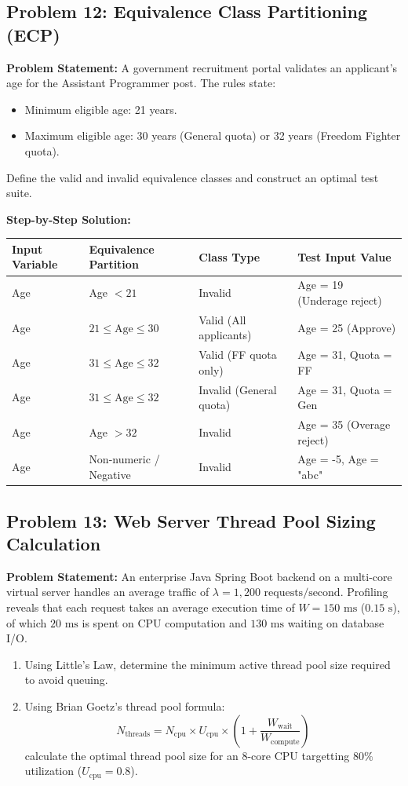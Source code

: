 \subsection*{Problem 12: Equivalence Class Partitioning (ECP)}
\textbf{Problem Statement:} A government recruitment portal validates an applicant's age for the Assistant Programmer post. The rules state:
\begin{itemize}
    \item Minimum eligible age: 21 years.
    \item Maximum eligible age: 30 years (General quota) or 32 years (Freedom Fighter quota).
\end{itemize}
Define the valid and invalid equivalence classes and construct an optimal test suite.

\textbf{Step-by-Step Solution:}
\begin{center}
\small
\begin{tabular}{p{3.5cm}p{5.5cm}p{3cm}p{3cm}}
\toprule
\textbf{Input Variable} & \textbf{Equivalence Partition} & \textbf{Class Type} & \textbf{Test Input Value} \\
\midrule
Age & Age $< 21$ & Invalid & Age = 19 (Underage reject) \\
Age & $21 \le \text{Age} \le 30$ & Valid (All applicants) & Age = 25 (Approve) \\
Age & $31 \le \text{Age} \le 32$ & Valid (FF quota only) & Age = 31, Quota = FF \\
Age & $31 \le \text{Age} \le 32$ & Invalid (General quota) & Age = 31, Quota = Gen \\
Age & Age $> 32$ & Invalid & Age = 35 (Overage reject) \\
Age & Non-numeric / Negative & Invalid & Age = -5, Age = "abc" \\
\bottomrule
\end{tabular}
\end{center}

\subsection*{Problem 13: Web Server Thread Pool Sizing Calculation}
\textbf{Problem Statement:} An enterprise Java Spring Boot backend on a multi-core virtual server handles an average traffic of $\lambda = 1,200\text{ requests/second}$. Profiling reveals that each request takes an average execution time of $W = 150\text{ ms}$ ($0.15\text{ s}$), of which $20\text{ ms}$ is spent on CPU computation and $130\text{ ms}$ waiting on database I/O.
\begin{enumerate}[label=(\alph*)]
    \item Using Little's Law, determine the minimum active thread pool size required to avoid queuing.
    \item Using Brian Goetz's thread pool formula:
    \[
    N_{\text{threads}} = N_{\text{cpu}} \times U_{\text{cpu}} \times \left(1 + \frac{W_{\text{wait}}}{W_{\text{compute}}}\right)
    \]
    calculate the optimal thread pool size for an 8-core CPU targetting $80\%$ utilization ($U_{\text{cpu}} = 0.8$).
\end{enumerate}

